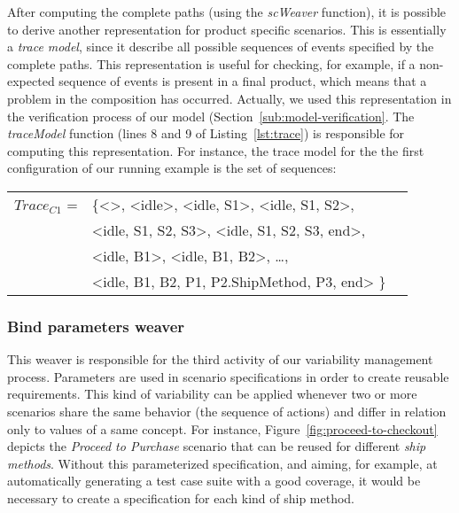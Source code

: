 After computing the complete paths (using the \emph{scWeaver} function), it is possible to derive another representation for product specific scenarios. This is essentially a \emph{trace model}, since it describe all possible sequences of events specified by the complete paths. This representation is useful for checking, for example, if a non-expected sequence of events is present in a final product, which means that a problem in the composition has occurred. Actually, we used this representation in the verification process of our model (Section~\ref{sub:model-verification}. The \emph{traceModel} function (lines 8 and 9 of Listing~\ref{lst:trace}) is responsible for computing this representation. For instance, the trace model for the the first configuration of our running example is the set of sequences:

\begin{small}
\begin{tabular}{rlc}
$Trace_{C1}$ = & \{<>, <idle>, <idle, S1>, <idle, S1, S2>, \\
                    & <idle, S1, S2, S3>,  <idle, S1, S2, S3, end>, \\
                    & <idle, B1>, <idle, B1, B2>, \ldots, \\
                    & <idle, B1, B2, P1, P2.ShipMethod, P3, end> \}
\end{tabular}
\end{small}



\subsubsection{Bind parameters weaver}\label{sub:bind-weaver}

This weaver is responsible for the third activity of our variability
management process. Parameters are used in scenario specifications
in order to create reusable requirements. This kind of variability can be applied
whenever two or more scenarios share the same behavior (the sequence
of actions) and differ in relation only to values of a same concept.
For instance, Figure~\ref{fig:proceed-to-checkout} depicts the \emph{Proceed to Purchase}
scenario that can be reused for different \emph{ship methods}. Without this
parameterized specification, and aiming, for example, at automatically generating a test case suite
with a good coverage, it would be necessary to create a specification for each kind of ship method.

